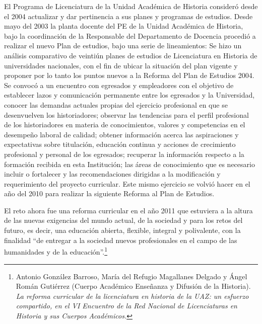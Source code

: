 El Programa de Licenciatura de la Unidad Académica de Historia 
consideró desde el 2004 actualizar y dar pertinencia a sus planes y 
programas de estudios. Desde mayo del 2003 la planta docente del PE de 
la Unidad Académica de Historia, bajo la coordinación de la Responsable 
del Departamento de Docencia procedió a realizar el nuevo Plan de 
estudios, bajo una serie de lineamientos: Se hizo un análisis 
comparativo de veintiún planes de estudios de Licenciatura en Historia  
de universidades nacionales, con el fin de ubicar la situación del plan 
vigente y proponer por lo tanto los puntos nuevos a la Reforma del Plan 
de Estudios 2004. Se convocó a un encuentro con egresados y empleadores 
con el objetivo de establecer lazos y comunicación permanente entre los 
egresados y la Universidad, conocer las demandas actuales propias del 
ejercicio profesional en que se desenvuelven los historiadores; 
observar las tendencias para el perfil profesional de los historiadores 
en materia de conocimientos, valores y competencias en el desempeño 
laboral de calidad; obtener información acerca las aspiraciones y 
expectativas sobre titulación, educación continua y acciones de 
crecimiento profesional y personal de los egresados; recuperar la 
información respecto a la formación recibida en esta Institución; las 
áreas de conocimiento que es necesario incluir o fortalecer y las 
recomendaciones dirigidas a la modificación y requerimiento del 
proyecto curricular. Este mismo ejercicio se volvió hacer en el año del 
2010 para realizar la siguiente Reforma al Plan de Estudios.


El reto ahora fue una reforma curricular en el año 2011 que estuviera a la
altura de las nuevas exigencias del mundo actual, de la sociedad y para los
retos del futuro, es decir, una educación abierta, flexible, integral y
polivalente, con la finalidad “de entregar a la sociedad nuevos
profesionales en el campo de las humanidades y de la educación”.\footnote{
Antonio González Barroso, María del Refugio Magallanes Delgado y Ángel
Román Gutiérrez (Cuerpo Académico Enseñanza y Difusión de la Historia).
\textit{La reforma curricular de la licenciatura en historia de la UAZ: un
esfuerzo compartido, en el VI Encuentro de la Red Nacional de
Licenciaturas en Historia y sus Cuerpos Académicos.}}

